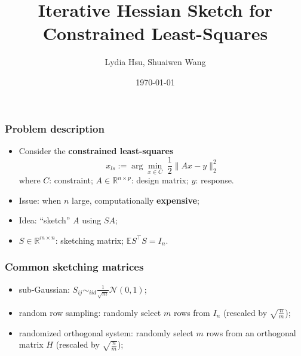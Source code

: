 \documentclass{beamer}
\title[Iterative Hessian Sketch]{Iterative Hessian Sketch for Constrained Least-Squares}
\author{Lydia Hsu, Shuaiwen Wang}
\date{\today} %
\begin{document}
\begin{frame}
\titlepage %
\end{frame}

\begin{frame}
    \frametitle{Problem description}

    \begin{itemize}
        \item<1-> Consider the \textbf{constrained least-squares}
            \begin{equation*}
                x_{ls} := \arg\min_{x \in C} \; \frac{1}{2} \|Ax-y\|^2_2
            \end{equation*}
            where \quad $C$: constraint; \quad $A \in \mathbb{R}^{n \times p}$: design matrix; \quad $y$: response.
        
        \item<2-> Issue: when $n$ large, computationally \textbf{expensive};
        \item<3-> Idea: ``sketch'' $A$ using $SA$;
        \item<4-> $S \in \mathbb{R}^{m \times n}$: sketching matrix; \quad
            $\mathbb{E} S^\top S = I_n$.
    \end{itemize}
\end{frame}

\begin{frame}
    \frametitle{Common sketching matrices}

    \begin{itemize}
        \item<1-> sub-Gaussian: $S_{ij} \sim_{iid} \frac{1}{\sqrt{m}}
            \mathcal{N}(0, 1)$; 
        \item<2-> random row sampling: randomly select $m$ rows from $I_n$
            (rescaled by $\sqrt{\frac{n}{m}}$);
        \item<3-> randomized orthogonal system: randomly select $m$ rows from
            an orthogonal matrix $H$ (rescaled by $\sqrt{\frac{n}{m}}$);
    \end{itemize}
\end{frame}
\end{document}

